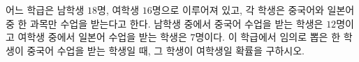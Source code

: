어느 학급은 남학생 $18$명, 여학생 $16$명으로 이루어져 있고, 각 학생은 중국어와 일본어 중 한 과목만 수업을 받는다고 한다. 남학생 중에서 중국어 수업을 받는 학생은 $12$명이고 여학생 중에서 일본어 수업을 받는 학생은 $7$명이다. 이 학급에서 임의로 뽑은 한 학생이 중국어 수업을 받는 학생일 때, 그 학생이 여학생일 확률을 구하시오.
